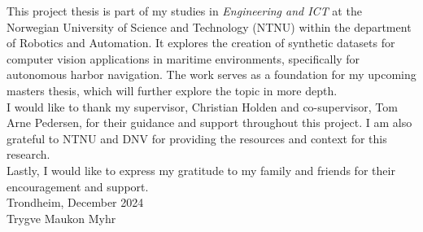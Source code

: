 
This project thesis is part of my studies in \textit{Engineering and ICT} at the Norwegian University of Science and Technology (NTNU) within the department of Robotics and Automation. It explores the creation of synthetic datasets for computer vision applications in maritime environments, specifically for autonomous harbor navigation. The work serves as a foundation for my upcoming masters thesis, which will further explore the topic in more depth.\\

\noindent I would like to thank my supervisor, Christian Holden and co-supervisor, Tom Arne Pedersen, for their guidance and support throughout this project. I am also grateful to NTNU and DNV for providing the resources and context for this research.\\

\noindent Lastly, I would like to express my gratitude to my family and friends for their encouragement and support.\\

\noindent Trondheim, December 2024\\
\noindent Trygve Maukon Myhr